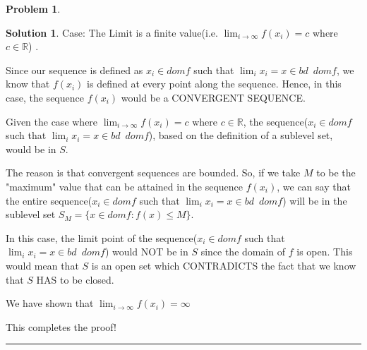 \documentclass{article}
\theoremstyle{definition}
\newtheorem{problem}{Problem}
\def\fline{\rule{0.75\linewidth}{0.5pt}}
\newcommand{\finishline}{\begin{center}\fline\end{center}}
\newtheorem*{solution*}{Solution}
\newenvironment{solution}{\begin{solution*}}{{\finishline} \end{solution*}}
\begin{document}
\begin{problem}
\begin{solution}
Case: The Limit is a finite value(i.e. $\lim_{i\to\infty} f(x_i) = c$ where $c \in \mathbb{R}$) . \newline 

Since our sequence is defined as $x_i \in dom f$ such that $\lim_{i} x_i = x \in bd \enspace dom f$, we know that $f(x_i)$ is defined at every point along the sequence.  Hence, in this case, the sequence $f(x_i)$ would be a CONVERGENT SEQUENCE. \newline 

Given the case where $\lim_{i\to\infty} f(x_i) = c$ where $c \in \mathbb{R}$, the sequence($x_i \in dom f$ such that $\lim_{i} x_i = x \in bd \enspace dom f$), based on the definition of a sublevel set, would be in $S$. \newline 

The reason is that convergent sequences are bounded. So, if we take $M$ to be the "maximum" value that can be attained in the sequence $f(x_i)$, we can say that the entire sequence($x_i \in dom f$ such that $\lim_{i} x_i = x \in bd \enspace dom f$) will be in the sublevel set $S_M = \{x \in dom f : f(x) \leq M \}$. \newline 

In this case, the limit point of the sequence($x_i \in dom f$ such that $\lim_{i} x_i = x \in bd \enspace dom f$) would NOT be in $S$ since the domain of $f$ is open. This would mean that $S$ is an open set which CONTRADICTS the fact that we know that $S$ HAS to be closed. \newline 

We have shown that $\lim_{i\to\infty} f(x_i) = \infty$\newline 

This completes the proof! 

\end{solution}
\end{problem}
\end{document}
